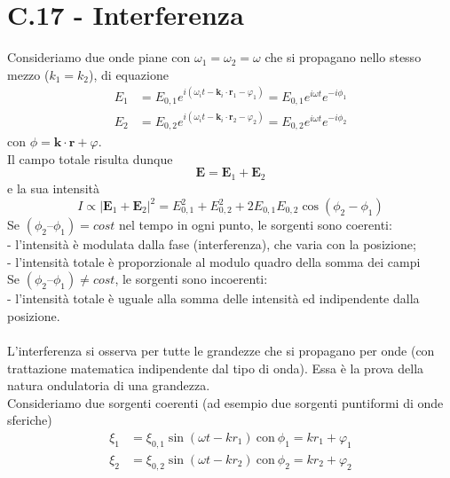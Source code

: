\documentclass{article}
\begin{document}
\section*{C.17 - Interferenza}
Consideriamo due onde piane con $\omega_1=\omega_2=\omega$ che si propagano nello stesso mezzo ($k_1 = k_2$), di equazione
\begin{equation}
\begin{split}
    E_1&= E_{0,1}e^{i(\omega_i t-\textbf{k}_i\cdot\textbf{r}_1-\varphi_1)}= E_{0,1}e^{i\omega t}e^{-i\phi_1}\\
    E_2&= E_{0,2}e^{i(\omega_i t-\textbf{k}_i\cdot\textbf{r}_2-\varphi_2)}= E_{0,2}e^{i\omega t}e^{-i\phi_2}
\end{split}   
\end{equation}
con $\phi=\textbf{k}\cdot\textbf{r}+\varphi$.\\
Il campo totale risulta dunque
\begin{equation}
    \textbf{E}=\textbf{E}_1+\textbf{E}_2
    \nonumber
\end{equation}
e la sua intensità
\begin{equation}
    I\propto|\textbf{E}_1+\textbf{E}_2|^2= E_{0,1}^2+E_{0,2}^2+2E_{0,1}E_{0,2}\cos(\phi_2-\phi_1)
\end{equation}
Se $(\phi_2 – \phi_1)=cost$ nel tempo in ogni punto, le sorgenti sono coerenti:\\
- l’intensità è modulata dalla fase (interferenza), che
varia con la posizione;\\
- l’intensità totale è proporzionale al modulo quadro della
somma dei campi\\
Se $(\phi_2 – \phi_1)\neq cost$, le sorgenti sono incoerenti:\\
- l’intensità totale è uguale alla somma delle intensità
ed indipendente dalla posizione.\\
\\
L’interferenza si osserva per tutte le grandezze che si propagano per onde (con trattazione matematica indipendente dal tipo di onda).
Essa è la prova della natura ondulatoria di una grandezza.\\
Consideriamo due sorgenti coerenti (ad esempio due sorgenti puntiformi di onde sferiche)
\begin{equation}
\begin{split}
    \xi_1&=\xi_{0,1}\sin(\omega t-kr_1) \ \text{con}\ \phi_1=kr_1+\varphi_1 \\
    \xi_2&=\xi_{0,2}\sin(\omega t-kr_2) \ \text{con}\ \phi_2=kr_2+\varphi_2
    \nonumber
\end{split} 
\end{equation}
\end{document}
